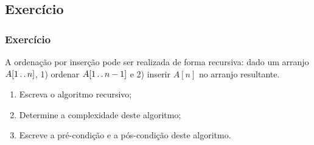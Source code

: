 \documentclass{beamer}
\begin{document}
\subsection{Exercício}

\begin{frame}

  \frametitle{Exercício}

  A ordenação por inserção pode ser realizada de forma
  recursiva: dado um arranjo $A[1 \mathinner{\ldotp\ldotp} n]$, \alert{1)} ordenar $A[1
    \mathinner{\ldotp\ldotp} n-1]$ e \alert{2)} inserir $A[n]$ no arranjo resultante.
  \begin{enumerate}
  \item Escreva o algoritmo recursivo;
  \item Determine a complexidade deste algoritmo;
  \item Escreve a pré-condição e a pós-condição deste algoritmo.
  \end{enumerate}
  
\end{frame}
\end{document}
